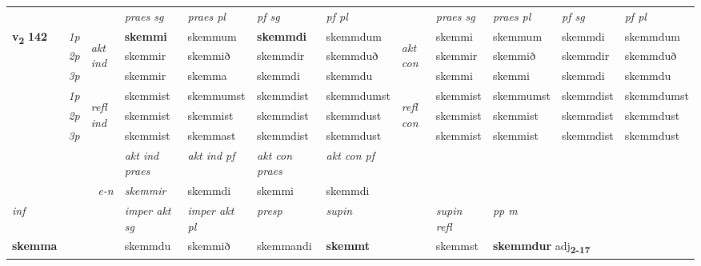 \begin{longtable}[l]{X>{\footnotesize\itshape}llXXXXlXXXX}
 & &   & \textit{praes sg}  & \textit{praes pl}    & \textit{ pf sg} & \textit{pf pl} & & \textit{praes sg}  & \textit{praes pl}    & \textit{pf sg} & \textit{pf pl }  \\ \cmidrule{4-7} \cmidrule{9-12}
 \multirow{2}{*}{{{\textbf{v{\textsubscript{2}}} \Large{\textbf{142}}}}}  & 1p & \multirow{3}{*}{\begin{turn}{90}\textit{akt ind}\end{turn}} & \textbf{skemmi} & skemmum & \textbf{skemmdi} & skemmdum & \multirow{3}{*}{\begin{turn}{90}\textit{akt con}\end{turn}} &skemmi & skemmum & skemmdi & skemmdum\\*
 & 2p &  &  skemmir  & skemmið & skemmdir & skemmduð & & skemmir & skemmið & skemmdir & skemmduð \\*
 & 3p &  & skemmir & skemma & skemmdi & skemmdu & & skemmi & skemmi& skemmdi & skemmdu \\*
\cmidrule{4-7} \cmidrule{9-12}
 & 1p & \multirow{3}{*}{\begin{turn}{90}\textit{refl ind}\end{turn}}  & skemmist & skemmumst & skemmdist & skemmdumst & \multirow{3}{*}{\begin{turn}{90}\textit{refl con}\end{turn}}  &skemmist & skemmumst & skemmdist & skemmdumst \\*
 & 2p &  & skemmist & skemmist & skemmdist & skemmdust & &skemmist & skemmist & skemmdist & skemmdust \\*
 & 3p  & & skemmist & skemmast & skemmdist & skemmdust & & skemmist & skemmist& skemmdist & skemmdust \\*
\cmidrule{4-7} \cmidrule{9-12}

   && &  \textit{akt ind praes} & \textit{akt ind pf} & \textit{akt con praes} & \textit{akt con pf} \\*
\multicolumn{3}{r}{\textit{e-n}} & skemmir & skemmdi & skemmi & skemmdi \\*

\cmidrule{4-7}
   {\textit{inf}} & &  & \textit{imper akt sg} & \textit{imper akt pl}   & \textit{presp} & \textit{supin} && \textit{supin refl} & \textit{pp m} \\*
  {\textbf{skemma}} & && skemmdu  & skemmið   & skemmandi &  \textbf{skemmt} && skemmst & \multicolumn{2}{l}{\textbf{skemmdur} adj\textbf{\textsubscript{2-17}}} \\*

\midrule


\end{longtable}
